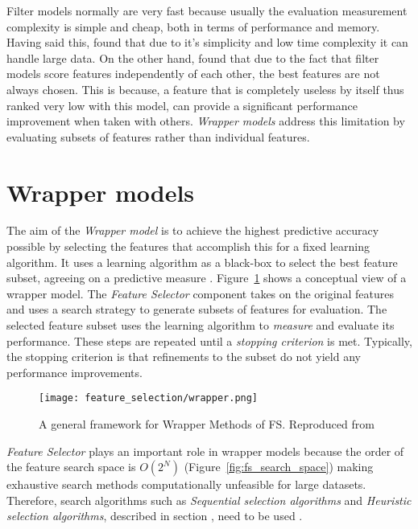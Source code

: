 Filter models normally are very fast because usually the evaluation measurement complexity is simple and cheap, both in terms of performance and memory. Having said this, \citet{garcia2015data} found that due to it's simplicity and low time complexity it can handle large data. On the other hand, \citet{guyon2003introduction} found that due to the fact that filter models score features independently of each other, the best features are not always chosen. This is because, a feature that is completely useless by itself thus ranked very low with this model, can provide a significant performance improvement when taken with others. \textit{Wrapper models} address this limitation by evaluating subsets of features rather than individual features.

\section{Wrapper models}\label{sec:fs_wrapper}
The aim of the \textit{Wrapper model} is to achieve the highest predictive accuracy possible by selecting the features that accomplish this for a fixed learning algorithm. It uses a learning algorithm as a black-box to select the best feature subset, agreeing on a predictive measure \citep{kohavi1995study}. Figure~\ref{fig:fs_wrapper} shows a conceptual view of a wrapper model. The \textit{Feature Selector} component takes on the original features and uses a search strategy to generate subsets of features for evaluation. The selected feature subset uses the learning algorithm to \textit{measure} and evaluate its performance. These steps are repeated until a \textit{stopping criterion} is met. Typically, the stopping criterion is that refinements to the subset do not yield any performance improvements.

\begin{figure}
  \texttt{[image: feature\_selection/wrapper.png]}
  \caption{A general framework for Wrapper Methods of FS. Reproduced from \citet{tang2014feature}}
  \label{fig:fs_wrapper}
\end{figure}

\textit{Feature Selector} plays an important role in wrapper models because the order of the feature search space is $O(2^N)$ (Figure~\ref{fig:fs_search_space}) making exhaustive search methods computationally unfeasible for large datasets. Therefore, search algorithms such as \textit{Sequential selection algorithms} and \textit{Heuristic selection algorithms}, described in section , need to be used \citep{chandrashekar2014survey}.

